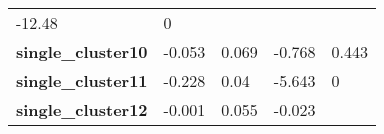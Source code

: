 \documentclass[]{article}
\begin{document}
\begin{longtable}[c]{@{}lllll@{}}
\begin{minipage}[t]{0.12\columnwidth}
-12.48
\strut\end{minipage} &
\begin{minipage}[t]{0.12\columnwidth}\raggedright\strut
0
\strut\end{minipage}\tabularnewline
\begin{minipage}[t]{0.31\columnwidth}\raggedright\strut
\textbf{single\_cluster10}
\strut\end{minipage} &
\begin{minipage}[t]{0.13\columnwidth}\raggedright\strut
-0.053
\strut\end{minipage} &
\begin{minipage}[t]{0.16\columnwidth}\raggedright\strut
0.069
\strut\end{minipage} &
\begin{minipage}[t]{0.12\columnwidth}\raggedright\strut
-0.768
\strut\end{minipage} &
\begin{minipage}[t]{0.12\columnwidth}\raggedright\strut
0.443
\strut\end{minipage}\tabularnewline
\begin{minipage}[t]{0.31\columnwidth}\raggedright\strut
\textbf{single\_cluster11}
\strut\end{minipage} &
\begin{minipage}[t]{0.13\columnwidth}\raggedright\strut
-0.228
\strut\end{minipage} &
\begin{minipage}[t]{0.16\columnwidth}\raggedright\strut
0.04
\strut\end{minipage} &
\begin{minipage}[t]{0.12\columnwidth}\raggedright\strut
-5.643
\strut\end{minipage} &
\begin{minipage}[t]{0.12\columnwidth}\raggedright\strut
0
\strut\end{minipage}\tabularnewline
\begin{minipage}[t]{0.31\columnwidth}\raggedright\strut
\textbf{single\_cluster12}
\strut\end{minipage} &
\begin{minipage}[t]{0.13\columnwidth}\raggedright\strut
-0.001
\strut\end{minipage} &
\begin{minipage}[t]{0.16\columnwidth}\raggedright\strut
0.055
\strut\end{minipage} &
\begin{minipage}[t]{0.12\columnwidth}\raggedright\strut
-0.023
\strut\end{minipage} &

\end{longtable}
\end{document}
